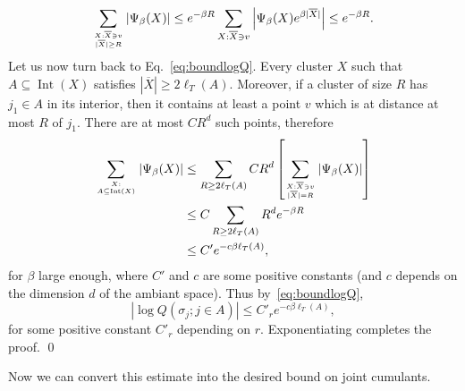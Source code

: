 \documentclass{amsart}
\DeclareMathOperator\Int{Int}
\numberwithin{equation}{section}
\theoremstyle{remark}
\renewenvironment{proof}[1][Proof]{\begin{trivlist}
\item[\hskip \labelsep {\bfseries #1:}]}{\qed\end{trivlist}}
\begin{document}
\begin{proof}
\begin{equation}
\label{eq:boundbetaLT}
\sum_{X: \overline{X} \ni v \atop |\overline{X}| \geq R} \left| \Psi_{\beta}(X)\right| \leq  e^{-\beta R} \sum_{X: \overline{X} \ni v} \left| \Psi_{\beta}(X) e^{\beta |\overline{X}|}\right| \leq e^{-\beta R}.
\end{equation}
Let us now turn back to Eq.~\eqref{eq:boundlogQ}. Every cluster $X$ such that $A \subseteq \Int(X)$ satisfies $|\overline{X}| \geq 2 \ell_T(A).$ Moreover, if a cluster of size $R$ has $j_1 \in A$ in its interior, then it contains at least a point $v$ which is at distance at most $R$ of $j_1$. There are at most $C R^d$ such points, therefore
\begin{align*}
\sum_{X : \atop A \subseteq \Int(X)} |\Psi_{\beta}(X)| &\leq \sum_{R \geq 2\ell_T(A)} C R^d  \left[\sum_{X: \overline{X} \ni v \atop |\overline{X}| = R} \left| \Psi_{\beta}(X)\right| \right] \\
&\leq C \sum_{R \geq 2\ell_T(A)} R^d e^{-\beta R} \\
&\leq C' e^{-c \beta \ell_T(A)},
\end{align*}
for $\beta$ large enough, where $C'$ and $c$ are some positive constants
(and $c$ depends on the dimension $d$ of the ambiant space).
Thus by~\eqref{eq:boundlogQ},
$$\left| \log Q \left(\sigma_j; j \in A \right) \right| \leq C'_r e^{-c \beta \ell_T(A)},$$
for some positive constant $C'_r$ depending on $r$.
Exponentiating completes the proof.
\end{proof}

Now we can convert this estimate into the desired bound on joint cumulants.
\end{document}
